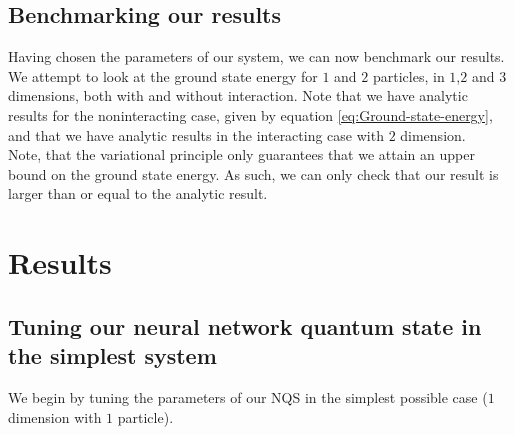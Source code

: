 \documentclass[a4paper, 10pt]{article}
\begin{document}
	\subsection{Benchmarking our results}
	Having chosen the parameters of our system, we can now benchmark our results. We attempt to look at the ground state energy for $1$ and $2$ particles, in $1$,$2$ and $3$ dimensions, both with and without interaction. Note that we have analytic results for the noninteracting case, given by equation \ref{eq:Ground-state-energy}, and that we have analytic results in the interacting case with $2$ dimension.\\
	\linebreak
	Note, that the variational principle only guarantees that we attain an upper bound on the ground state energy. As such, we can only check that our result is larger than or equal to the analytic result.
 	\section{Results}
	\subsection{Tuning our neural network quantum state in the simplest system}\label{sec:res_tuning_parameters_noninteracting}
	We begin by tuning the parameters of our NQS in the simplest possible case ($1$ dimension with $1$ particle).
\end{document}

